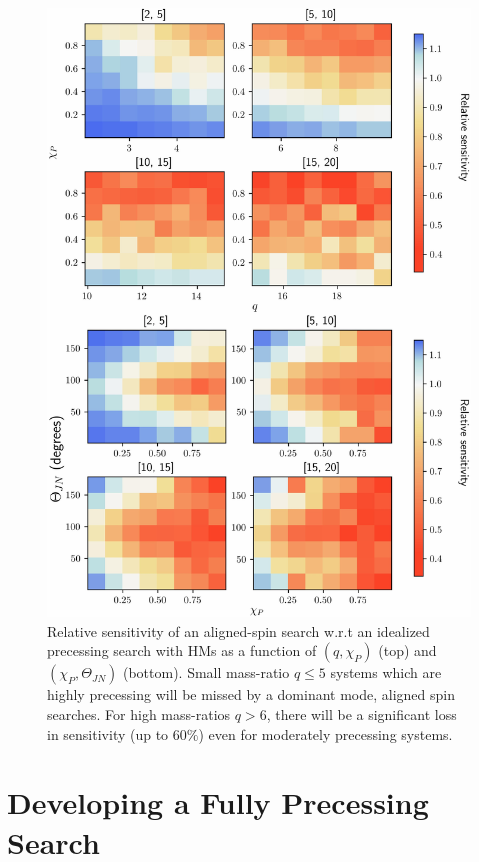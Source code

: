 \begin{figure}
        \centering
        \includegraphics[width=0.85\linewidth]{figures/HM_and_precession/Merged.pdf}
        \caption{Relative sensitivity of an aligned-spin search w.r.t an idealized precessing search with HMs as a function of  $(q, \chi_P)$ (top) and $(\chi_{P}, \Theta_{JN})$ (bottom). Small mass-ratio $q \leq 5$ systems which are highly precessing will be missed by a dominant mode, aligned spin searches. For high mass-ratios $q > 6$, there will be a significant loss in sensitivity (up to $60\%$) even for moderately precessing systems.}
        \label{fig:merged}
\end{figure}


\section{Developing a Fully Precessing Search}\label{sec:challenges}


